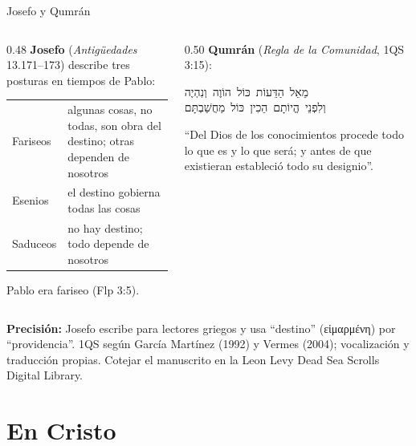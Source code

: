 \documentclass[hyperref={bookmarks=false},aspectratio=169]{beamer}
\newcommand{\heb}[1]{\mbox{\foreignlanguage{hebrew}{#1}}}
\newcommand{\grc}[1]{\foreignlanguage{ancientgreek}{#1}}
\newcommand{\precision}[1]{{\footnotesize\color{gris}\textbf{Precisión:} #1}}
\begin{document}
\begin{frame}{Josefo y Qumrán}
\begin{columns}[t,onlytextwidth]
\begin{column}{0.48\textwidth}\small
\textbf{Josefo} (\emph{Antigüedades} 13.171--173) describe tres posturas en tiempos de Pablo:
\scriptsize\renewcommand{\arraystretch}{1.15}
\begin{tabular}{@{}>{\RaggedRight\arraybackslash}p{1.6cm}>{\RaggedRight\arraybackslash}p{3.6cm}@{}}
\toprule
Fariseos & algunas cosas, no todas, son obra del destino; otras dependen de nosotros \\
Esenios & el destino gobierna todas las cosas \\
Saduceos & no hay destino; todo depende de nosotros \\
\bottomrule
\end{tabular}\par\smallskip
\small Pablo era fariseo (Flp 3:5).
\end{column}
\begin{column}{0.50\textwidth}\small
\textbf{Qumrán} (\emph{Regla de la Comunidad}, 1QS 3:15):
\begin{center}\heb{מֵאֵל הַדֵּעוֹת כּוֹל הוֹוֶה וְנִהְיֶה}\\ \heb{וְלִפְנֵי הֱיוֹתָם הֵכִין כּוֹל מַחֲשַׁבְתָּם}\end{center}
``Del Dios de los conocimientos procede todo lo que es y lo que será; y antes de que existieran estableció todo su designio''.
\end{column}
\end{columns}\par\smallskip
\precision{Josefo escribe para lectores griegos y usa ``destino'' (\grc{εἱμαρμένη}) por ``providencia''. 1QS según García Martínez (1992) y Vermes (2004); vocalización y traducción propias. Cotejar el manuscrito en la Leon Levy Dead Sea Scrolls Digital Library.}
\end{frame}

\section{En Cristo}
\end{document}
